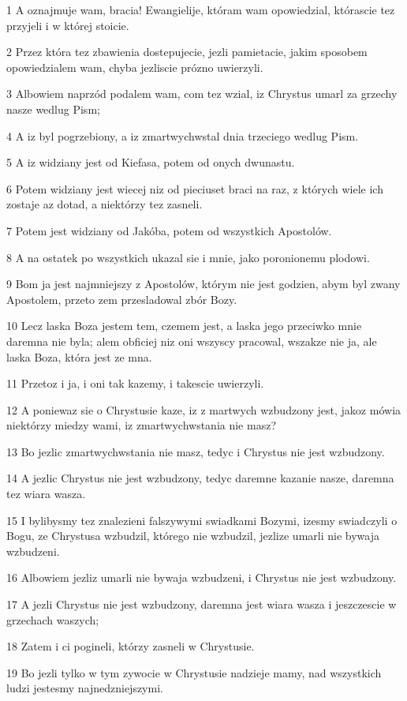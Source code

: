 \par 1 A oznajmuje wam, bracia! Ewangielije, któram wam opowiedzial, którascie tez przyjeli i w której stoicie.
\par 2 Przez która tez zbawienia dostepujecie, jezli pamietacie, jakim sposobem opowiedzialem wam, chyba jezliscie prózno uwierzyli.
\par 3 Albowiem naprzód podalem wam, com tez wzial, iz Chrystus umarl za grzechy nasze wedlug Pism;
\par 4 A iz byl pogrzebiony, a iz zmartwychwstal dnia trzeciego wedlug Pism.
\par 5 A iz widziany jest od Kiefasa, potem od onych dwunastu.
\par 6 Potem widziany jest wiecej niz od pieciuset braci na raz, z których wiele ich zostaje az dotad, a niektórzy tez zasneli.
\par 7 Potem jest widziany od Jakóba, potem od wszystkich Apostolów.
\par 8 A na ostatek po wszystkich ukazal sie i mnie, jako poronionemu plodowi.
\par 9 Bom ja jest najmniejszy z Apostolów, którym nie jest godzien, abym byl zwany Apostolem, przeto zem przesladowal zbór Bozy.
\par 10 Lecz laska Boza jestem tem, czemem jest, a laska jego przeciwko mnie daremna nie byla; alem obficiej niz oni wszyscy pracowal, wszakze nie ja, ale laska Boza, która jest ze mna.
\par 11 Przetoz i ja, i oni tak kazemy, i takescie uwierzyli.
\par 12 A poniewaz sie o Chrystusie kaze, iz z martwych wzbudzony jest, jakoz mówia niektórzy miedzy wami, iz zmartwychwstania nie masz?
\par 13 Bo jezlic zmartwychwstania nie masz, tedyc i Chrystus nie jest wzbudzony.
\par 14 A jezlic Chrystus nie jest wzbudzony, tedyc daremne kazanie nasze, daremna tez wiara wasza.
\par 15 I bylibysmy tez znalezieni falszywymi swiadkami Bozymi, izesmy swiadczyli o Bogu, ze Chrystusa wzbudzil, którego nie wzbudzil, jezlize umarli nie bywaja wzbudzeni.
\par 16 Albowiem jezliz umarli nie bywaja wzbudzeni, i Chrystus nie jest wzbudzony.
\par 17 A jezli Chrystus nie jest wzbudzony, daremna jest wiara wasza i jeszczescie w grzechach waszych;
\par 18 Zatem i ci pogineli, którzy zasneli w Chrystusie.
\par 19 Bo jezli tylko w tym zywocie w Chrystusie nadzieje mamy, nad wszystkich ludzi jestesmy najnedzniejszymi.
